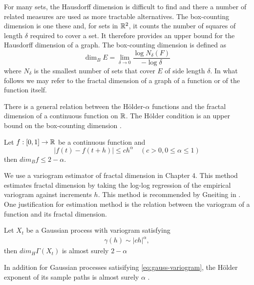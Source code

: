 
For many sets, the Hausdorff dimension is difficult to find and there a number of related measures are used as more tractable  alternatives. 
The box-counting dimension is one these and, for sets in $\mathbb R^2$, 
it counts the number of squares of length $\delta$ required
to cover a set. It therefore provides an upper bound for the 
Hausdorff dimension of a graph. The box-counting dimension 
is defined as
\[
  \dim_B E = \lim_{\delta \to 0} \frac{ \log N_{\delta}(F)}
  {- \log \delta}
\]
where $N_{\delta}$ is the smallest number of sets 
that cover $E$ of side length $\delta$. In what follows 
we may refer to the fractal dimension of a graph of a function
or of the function itself. 

There is a general relation between the 
H\"older-$\alpha$ functions and the fractal dimension of 
a continuous function on $\mathbb R$. The H\"older 
condition is an upper bound on the box-counting dimension
\cite{falconer2003}.
\begin{prop}
  Let $f:[0, 1] \to \mathbb R$ be a continuous function 
  and 
  \[  
    |f(t) - f(t + h)| \leq ch^{\alpha} \hspace{1em} 
    (c > 0, 0 \leq \alpha \leq 1)
  \]
  then $dim_B f \leq 2 - \alpha $.
\end{prop}

We use a variogram estimator of fractal dimension in Chapter 4. 
This method estimates fractal dimension by taking the log-log regression of the empirical variogram against increments $h$. This method is recommended by Gneiting in \cite{gneiting2012}.
One justification for estimation method is the relation between 
the variogram of a function and its fractal dimension.
\begin{prop}\label{prop:gauss-variogram}
  Let $X_t$ be a Gaussian process with variogram satisfying
  \begin{align}\label{eq:gauss-variogram}
    \gamma(h) \sim|ch|^{\alpha},
  \end{align}  
  then $dim_H \Gamma(X_t)$ is almost surely $2 - \alpha$
\end{prop}
In addition for Gaussian processes satisifying 
\ref{eq:gauss-variogram}, the H\"older exponent of its sample paths
is almost surely $\alpha$\cite{gneiting2012} \cite{orey1970}. 


